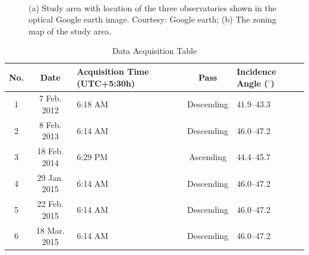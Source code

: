 \begin{figure}[!th]
	\centering
	 \\
	\caption{(a) Study area with location of the three observatories shown in the optical Google earth image. Courtesy: Google earth; (b) The zoning map of the study area. }
	\label{fig:study_area}
\end{figure}

\begin{table}[!th]
	\caption{Data Acquisition Table}
	\begin{center}
		\begin{tabular}{|c|c|p{3cm}|c|p{2cm}|} \hline
			No. & Date & Acquisition Time (UTC+5:30h) & Pass & Incidence Angle ($^\circ$) \\ \hline \hline
			1 &  7 Feb. 2012 & 6:18 AM & Descending & 41.9--43.3\\ \hline
			2 &  8 Feb. 2013 & 6:14 AM & Descending & 46.0--47.2\\ \hline
			3 & 18 Feb. 2014 & 6:29 PM & Ascending & 44.4--45.7\\ \hline \hline
			4 & 29 Jan. 2015 & 6:14 AM & Descending & 46.0--47.2 \\ \hline
			5 & 22 Feb. 2015 & 6:14 AM & Descending & 46.0--47.2 \\ \hline
			6 & 18 Mar. 2015 & 6:14 AM & Descending & 46.0--47.2 \\ \hline
		\end{tabular}
	\end{center}
	\label{table:data acquisition_sd}
\end{table}

